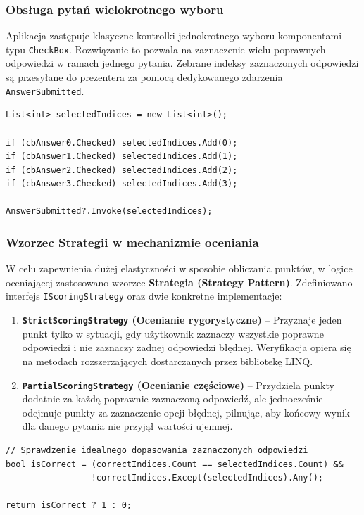 \documentclass[12pt,a4paper]{article}
\begin{document}
\subsubsection{Obsługa pytań wielokrotnego wyboru}
Aplikacja zastępuje klasyczne kontrolki jednokrotnego wyboru komponentami typu \texttt{CheckBox}. Rozwiązanie to pozwala na zaznaczenie wielu poprawnych odpowiedzi w ramach jednego pytania. Zebrane indeksy zaznaczonych odpowiedzi są przesyłane do prezentera za pomocą dedykowanego zdarzenia \texttt{AnswerSubmitted}.

\begin{lstlisting}[caption={Zbieranie odpowiedzi z kontrolek CheckBox w widoku}]
List<int> selectedIndices = new List<int>();

if (cbAnswer0.Checked) selectedIndices.Add(0);
if (cbAnswer1.Checked) selectedIndices.Add(1);
if (cbAnswer2.Checked) selectedIndices.Add(2);
if (cbAnswer3.Checked) selectedIndices.Add(3);

AnswerSubmitted?.Invoke(selectedIndices);
\end{lstlisting}

\subsubsection{Wzorzec Strategii w mechanizmie oceniania}
W celu zapewnienia dużej elastyczności w sposobie obliczania punktów, w logice oceniającej zastosowano wzorzec \textbf{Strategia (Strategy Pattern)}. Zdefiniowano interfejs \texttt{IScoringStrategy} oraz dwie konkretne implementacje:

\begin{enumerate}
    \item \textbf{\texttt{StrictScoringStrategy} (Ocenianie rygorystyczne)} -- Przyznaje jeden punkt tylko w sytuacji, gdy użytkownik zaznaczy wszystkie poprawne odpowiedzi i nie zaznaczy żadnej odpowiedzi błędnej. Weryfikacja opiera się na metodach rozszerzających dostarczanych przez bibliotekę LINQ.
    \item \textbf{\texttt{PartialScoringStrategy} (Ocenianie częściowe)} -- Przydziela punkty dodatnie za każdą poprawnie zaznaczoną odpowiedź, ale jednocześnie odejmuje punkty za zaznaczenie opcji błędnej, pilnując, aby końcowy wynik dla danego pytania nie przyjął wartości ujemnej.
\end{enumerate}

\begin{lstlisting}[caption={Implementacja rygorystycznego zliczania punktów przy użyciu LINQ}]
// Sprawdzenie idealnego dopasowania zaznaczonych odpowiedzi
bool isCorrect = (correctIndices.Count == selectedIndices.Count) &&
                 !correctIndices.Except(selectedIndices).Any();

return isCorrect ? 1 : 0;
\end{lstlisting}
\end{document}
